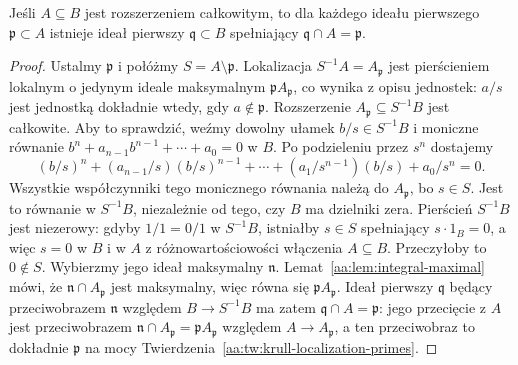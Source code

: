 \begin{twierdzenie}\label{aa:tw:integral-lying-over}
Jeśli $A\subseteq B$ jest rozszerzeniem całkowitym, to dla
każdego ideału pierwszego $\mathfrak p\subset A$ istnieje
ideał pierwszy $\mathfrak q\subset B$ spełniający
$\mathfrak q\cap A=\mathfrak p$.
\end{twierdzenie}
\begin{proof}
Ustalmy $\mathfrak p$ i połóżmy $S=A\setminus\mathfrak p$.
Lokalizacja $S^{-1}A=A_{\mathfrak p}$ jest pierścieniem
lokalnym o jedynym ideale maksymalnym
$\mathfrak pA_{\mathfrak p}$, co wynika z opisu jednostek:
$a/s$ jest jednostką dokładnie wtedy, gdy $a\notin\mathfrak p$.
Rozszerzenie $A_{\mathfrak p}\subseteq S^{-1}B$ jest
całkowite. Aby to sprawdzić, weźmy dowolny ułamek
$b/s\in S^{-1}B$ i moniczne równanie
$b^n+a_{n-1}b^{n-1}+\cdots+a_0=0$ w $B$.
Po podzieleniu przez $s^n$ dostajemy
\[
(b/s)^n+(a_{n-1}/s)(b/s)^{n-1}
+\cdots+(a_1/s^{n-1})(b/s)+a_0/s^n=0.
\]
Wszystkie współczynniki tego monicznego równania należą
do $A_{\mathfrak p}$, bo $s\in S$.
Jest to równanie w $S^{-1}B$, niezależnie od tego,
czy $B$ ma dzielniki zera.
Pierścień $S^{-1}B$ jest niezerowy: gdyby $1/1=0/1$
w $S^{-1}B$, istniałby $s\in S$ spełniający $s\cdot1_B=0$,
a więc $s=0$ w $B$ i w $A$ z różnowartościowości
włączenia $A\subseteq B$. Przeczyłoby to $0\notin S$.
Wybierzmy jego ideał maksymalny $\mathfrak n$.
Lemat~\ref{aa:lem:integral-maximal} mówi, że
$\mathfrak n\cap A_{\mathfrak p}$ jest maksymalny, więc
równa się $\mathfrak pA_{\mathfrak p}$.
Ideał pierwszy $\mathfrak q$ będący przeciwobrazem
$\mathfrak n$ względem $B\to S^{-1}B$ ma zatem
$\mathfrak q\cap A=\mathfrak p$: jego przecięcie z $A$
jest przeciwobrazem $\mathfrak n\cap A_{\mathfrak p}
=\mathfrak p A_{\mathfrak p}$ względem
$A\to A_{\mathfrak p}$, a ten przeciwobraz to dokładnie
$\mathfrak p$ na mocy
Twierdzenia~\ref{aa:tw:krull-localization-primes}.
\end{proof}

